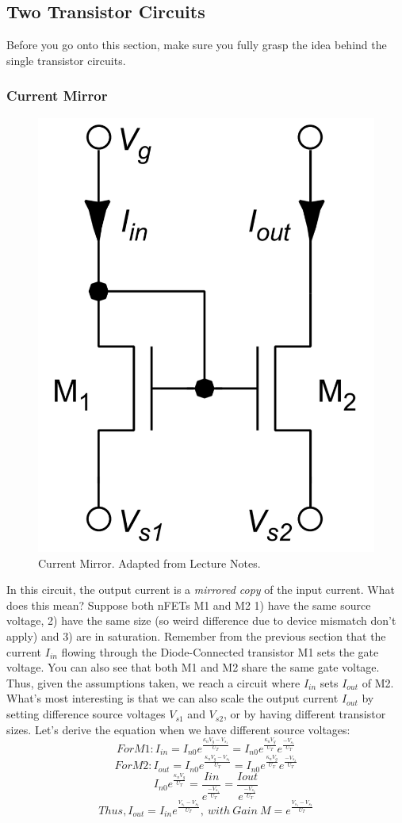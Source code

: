 \subsection{Two Transistor Circuits}
Before you go onto this section, make sure you fully grasp the idea behind the single transistor circuits. 
\subsubsection{Current Mirror}
\begin{figure}[H]
    \centering
    \includegraphics[width=0.3\linewidth]{../../Figures/Current_Mirror.PNG}
    \caption{Current Mirror. Adapted from Lecture Notes.}
    \label{fig:N-Type Current Mirror}
\end{figure}
In this circuit, the output current is a \emph{mirrored copy} of the input current. What does this mean? Suppose both nFETs M1 and M2 1) have the same source voltage, 2) have the same size (so weird difference due to device mismatch don't apply) and 3) are in saturation. Remember from the previous section that the current $I_{in}$ flowing through the Diode-Connected transistor M1 sets the gate voltage. You can also see that both M1 and M2 share the same gate voltage. Thus, given the assumptions taken, we reach a circuit where $I_{in}$ sets $I_{out}$ of M2. What's most interesting is that we can also scale the output current $I_{out}$ by setting difference source voltages $V_{s1}$ and $V_{s2}$, or by having different transistor sizes. Let's derive the equation when we have different source voltages: 
\begin{equation}
For M1: I_{in} = I_{n0} e^{\frac{\kappa_{n}V_g - V_{s_1}}{U_T}} = I_{n0} e^{\frac{\kappa_{n}V_g }{U_T}}e^{\frac{-V_{s_1}}{U_T}}
\end{equation}
\begin{equation}
For M2: I_{out} = I_{n0} e^{\frac{\kappa_{n}V_g - V_{s_2}}{U_T}} = I_{n0} e^{\frac{\kappa_{n}V_g }{U_T}}e^{\frac{-V_{s_2}}{U_T}}
\end{equation}
\begin{equation}
I_{n0} e^{\frac{\kappa_{n}V_g }{U_T}} = \frac{I{in}}{e^{\frac{-V_{s_1}}{U_T}}} = \frac{I{out}}{e^{\frac{-V_{s_2}}{U_T}}}
\end{equation}
\begin{equation}
Thus, I_{out} = I_{in} e^{\frac{V_{s_1} - V_{s_2}}{U_T}}, \ with \ Gain \ M = e^{\frac{V_{s_1} - V_{s_2}}{U_T}}
\end{equation}


